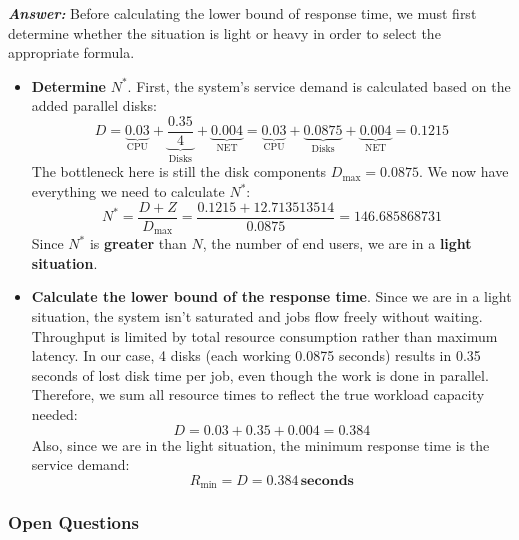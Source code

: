 \begin{enumerate}
    \textcolor{Green3}{\textbf{\emph{Answer:}}} Before calculating the lower bound of response time, we must first determine whether the situation is light or heavy in order to select the appropriate formula.
    \begin{itemize}
        \item \textbf{Determine} $N^{*}$. First, the system's service demand is calculated based on the added parallel disks:
        \begin{equation*}
            D = \underbrace{0.03}_{\text{CPU}} + \underbrace{\dfrac{0.35}{4}}_{\text{Disks}} + \underbrace{0.004}_{\text{NET}} = \underbrace{0.03}_{\text{CPU}} + \underbrace{0.0875}_{\text{Disks}} + \underbrace{0.004}_{\text{NET}} = 0.1215
        \end{equation*}
        The bottleneck here is still the disk components $D_{\max} = 0.0875$. We now have everything we need to calculate $N^{*}$:
        \begin{equation*}
            N^{*} = \dfrac{D + Z}{D_{\max}} = \dfrac{0.1215 + 12.713513514}{0.0875} = 146.685868731
        \end{equation*}
        Since $N^{*}$ is \textbf{greater} than $N$, the number of end users, we are in a \textbf{light situation}.

        \item \textbf{Calculate the lower bound of the response time}. Since we are in a light situation, the system isn't saturated and jobs flow freely without waiting. Throughput is limited by total resource consumption rather than maximum latency. In our case, 4 disks (each working 0.0875 seconds) results in 0.35 seconds of lost disk time per job, even though the work is done in parallel. Therefore, we sum all resource times to reflect the true workload capacity needed:
        \begin{equation*}
            D = 0.03 + 0.35 + 0.004 = 0.384
        \end{equation*}
        Also, since we are in the light situation, the minimum response time is the service demand:
        \begin{equation*}
            R_{\min} = D = \mathbf{0.384} \, \textbf{seconds}
        \end{equation*}
    \end{itemize}
\end{enumerate}

\newpage

\subsubsection*{Open Questions}


